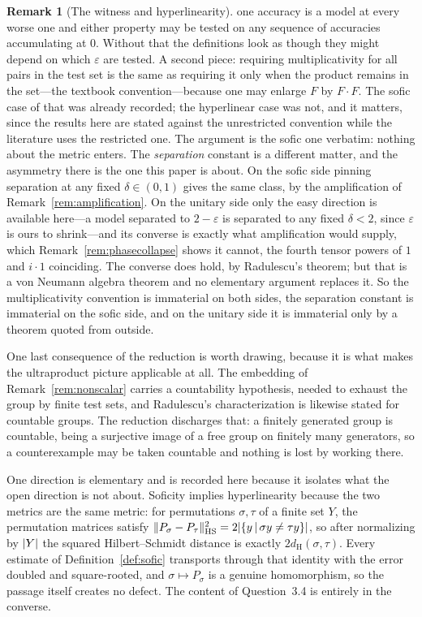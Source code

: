 \documentclass[11pt]{amsart}
\theoremstyle{definition}
\newtheorem{remark}[theorem]{Remark}
\theoremstyle{plain}
\newcommand{\eps}{\varepsilon}
\newcommand{\distH}{d_{\mathrm H}}
\DeclarePairedDelimiter{\abs}{\lvert}{\rvert}
\DeclarePairedDelimiter{\norm}{\lVert}{\rVert}
\newcommand{\set}[1]{\left\{#1\right\}}
\newcommand{\suchthat}{\,\middle|\,}
\begin{document}
\begin{remark}[The witness and hyperlinearity]
one accuracy is a model at every worse one and either property may be tested on any sequence of accuracies accumulating at \(0\).  Without that the definitions look as though they might depend on which \(\eps\) are tested.  A second piece: requiring multiplicativity for all pairs in the test set is the same as requiring it only when the product remains in the set---the textbook convention---because one may enlarge \(F\) by \(F\!\cdot\!F\).  The sofic case of that was already recorded; the hyperlinear case was not, and it matters, since the results here are stated against the unrestricted convention while the literature uses the restricted one.  The argument is the sofic one verbatim: nothing about the metric enters.  The \emph{separation} constant is a different matter, and the asymmetry there is the one this paper is about.  On the sofic side pinning separation at any fixed \(\delta\in(0,1)\) gives the same class, by the amplification of Remark~\ref{rem:amplification}.  On the unitary side only the easy direction is available here---a model separated to \(2-\eps\) is separated to any fixed \(\delta<2\), since \(\eps\) is ours to shrink---and its converse is exactly what amplification would supply, which Remark~\ref{rem:phasecollapse} shows it cannot, the fourth tensor powers of \(1\) and \(i\cdot1\) coinciding.  The converse does hold, by Radulescu's theorem; but that is a von Neumann algebra theorem and no elementary argument replaces it.  So the multiplicativity convention is immaterial on both sides, the separation constant is immaterial on the sofic side, and on the unitary side it is immaterial only by a theorem quoted from outside.

One last consequence of the reduction is worth drawing, because it is what makes the ultraproduct picture applicable at all.  The embedding of Remark~\ref{rem:nonscalar} carries a countability hypothesis, needed to exhaust the group by finite test sets, and Radulescu's characterization is likewise stated for countable groups.  The reduction discharges that: a finitely generated group is countable, being a surjective image of a free group on finitely many generators, so a counterexample may be taken countable and nothing is lost by working there.

One direction is elementary and is recorded here because it isolates what the open direction is not about.  Soficity implies hyperlinearity because the two metrics are the same metric: for permutations \(\sigma,\tau\) of a finite set \(Y\), the permutation matrices satisfy \(\norm{P_\sigma-P_\tau}_{\mathrm{HS}}^2=2\abs{\set{y\suchthat\sigma y\ne\tau y}}\), so after normalizing by \(\abs Y\) the squared Hilbert--Schmidt distance is exactly \(2\distH(\sigma,\tau)\).  Every estimate of Definition~\ref{def:sofic} transports through that identity with the error doubled and square-rooted, and \(\sigma\mapsto P_\sigma\) is a genuine homomorphism, so the passage itself creates no defect.  The content of Question~3.4 is entirely in the converse.


\end{remark}
\end{document}
